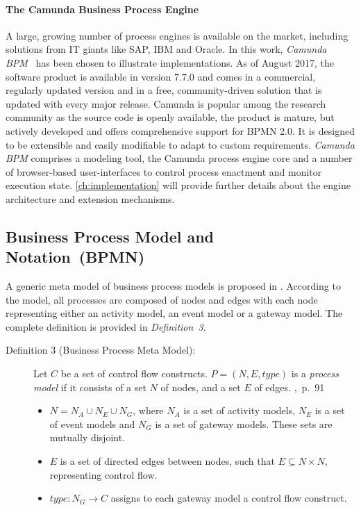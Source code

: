 \paragraph{The Camunda Business Process Engine}
A large, growing number of process engines is available on the market, including solutions from IT giants like SAP, IBM and Oracle.
In this work, \emph{Camunda BPM}~\cite{camunda} has been chosen to illustrate implementations.
As of August 2017, the software product is available in version 7.7.0 and comes in a commercial, regularly updated version and in a free, community-driven solution that is updated with every major release.
Camunda is popular among the research community as the source code is openly available, the product is mature, but actively developed and offers comprehensive support for BPMN 2.0. It is designed to be extensible and easily modifiable to adapt to custom requirements.
\emph{Camunda BPM} comprises a modeling tool, the Camunda process engine core and a number of browser-based user-interfaces to control process enactment and monitor execution state.
\autoref{ch:implementation} will provide further details about the engine architecture and extension mechanisms.


\subsection{Business Process Model and Notation~(BPMN)}

A generic meta model of business process models is proposed in \cite{weske:bpm-book}.
According to the model, all processes are composed of nodes and edges with each node representing either an activity model, an event model or a gateway model. The complete definition is provided in \textit{Definition~3}.

\pagebreak

\begin{description}
	\item[Definition 3 (Business Process Meta Model):]
	Let $C$ be a set of control flow constructs. $P = (N,E,type)$ is a \textit{process model} if it consists of a set $N$ of nodes, and a set $E$ of edges. \cite{weske:bpm-book},~p.~91
	\begin{itemize} 
		\item
		$N = N_{A}\cup N_{E}\cup N_{G}$, where $N_{A}$ is a set of activity models, $N_{E}$ is a set of event models and $N_{G}$ is a set of gateway models. These sets are mutually disjoint.
		\item 
		$E$ is a set of directed edges between nodes, such that $E\subseteq N \times N$, representing control flow.
		\item
		$type:N_{G}\rightarrow C$ assigns to each gateway model a control flow construct.
	\end{itemize}
\end{description}

